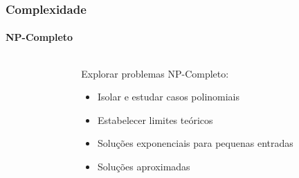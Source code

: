 \begin{frame}
\frametitle{Complexidade}
\framesubtitle{NP-Completo}
 \begin{columns}[T]
    \begin{column}{.5\textwidth}
    \centering
    \end{column}
    \begin{column}{.5\textwidth}
        Explorar problemas NP-Completo:
        \begin{itemize}
            \item{Isolar e estudar casos polinomiais}
            \item{Estabelecer limites teóricos}
            \item{Soluções exponenciais para pequenas entradas}
            \item{Soluções aproximadas}
        \end{itemize}
    \end{column}
  \end{columns}
\end{frame}


